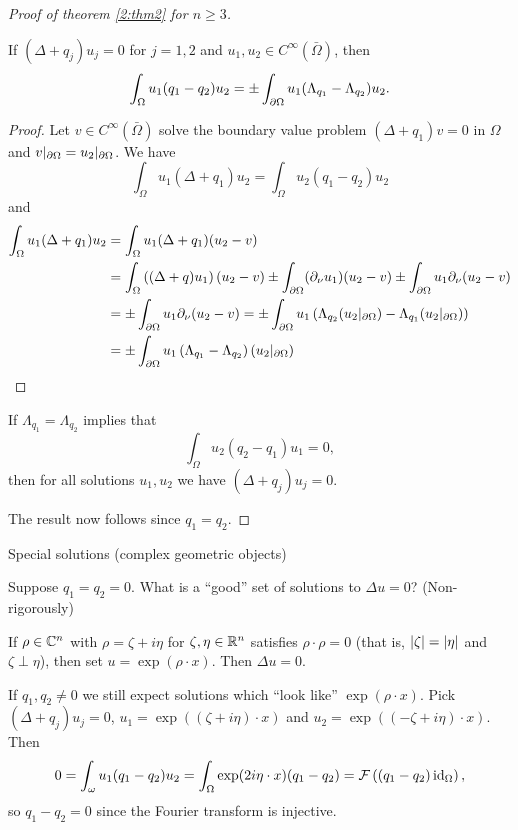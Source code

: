 \begin{proof}[Proof of theorem \ref{2:thm2} for $n \geq 3$]
  \begin{prop}
    If $(\Delta+q_j)u_j=0$ for $j=1,2$ and $u_1,u_2 \in C^\infty(\bar\Omega)$, then
    \[ \int_\Omega u_1(q_1-q_2)u_2 = \pm \int_{\partial\Omega} u_1(\Lambda_{q_1}-\Lambda_{q_2})u_2. \]
  \end{prop}

  \begin{proof}
    Let $v \in C^\infty(\bar\Omega)$ solve the boundary value problem $(\Delta+q_1)v=0$ in $\Omega$ and $v|_{\partial\Omega}=u_2|_{\partial\Omega}$.
    We have
    \[ \int_\Omega u_1(\Delta+q_1)u_2 = \int_\Omega u_2(q_1-q_2)u_2 \]
    and
    \begin{align*}
      \int_\Omega u_1(\Delta+q_1)u_2 &= \int_\Omega u_1(\Delta+q_1)(u_2-v) \\
      &= \int_\Omega \left( (\Delta+q)u_1 \right)(u_2-v) \pm \int_{\partial\Omega} (\partial_\nu u_1)(u_2-v) \pm \int_{\partial\Omega} u_1 \partial_\nu(u_2-v) \\
      &= \pm \int_{\partial\Omega} u_1 \partial_\nu (u_2-v) = \pm \int_{\partial\Omega} u_1\left( \Lambda_{q_2}(u_2|_{\partial\Omega}) - \Lambda_{q_1}(u_2|_{\partial\Omega}) \right) \\
      &= \pm \int_{\partial\Omega} u_1 \left( \Lambda_{q_1}-\Lambda_{q_2} \right)(u_2|_{\partial\Omega}) \qedhere
    \end{align*}
  \end{proof}

  \begin{cor}
    If $\Lambda_{q_1}=\Lambda_{q_2}$ implies that
    \[ \int_\Omega u_2(q_2-q_1)u_1=0, \]
    then for all solutions $u_1,u_2$ we have $(\Delta+q_j)u_j=0$.
  \end{cor}

  The result now follows since $q_1=q_2$.
\end{proof}

Special solutions (complex geometric objects)

Suppose $q_1=q_2=0$.
What is a ``good'' set of solutions to $\Delta u=0$?
(Non-rigorously)

If $\rho \in \mathbb{C}^n$ with $\rho=\zeta+i\eta$ for $\zeta,\eta \in \mathbb{R}^n$ satisfies $\rho \cdot \rho = 0$ (that is, $\left\lvert \zeta \right\rvert=\left\lvert \eta \right\rvert$ and $\zeta \perp \eta$), then set $u=\exp(\rho \cdot x)$.
Then $\Delta u=0$.

If $q_1,q_2 \neq 0$ we still expect solutions which ``look like'' $\exp(\rho \cdot x)$.
Pick $(\Delta+q_j)u_j=0$, $u_1=\exp\left( (\zeta+i\eta) \cdot x \right)$ and $u_2=\exp\left( (-\zeta+i\eta) \cdot x \right)$.
Then
\[ 0 = \int_\omega u_1(q_1-q_2)u_2 = \int_\Omega \exp(2i\eta \cdot x) (q_1-q_2) = \mathcal{F} \left( (q_1-q_2)\operatorname{id}_\Omega \right), \]
so $q_1-q_2=0$ since the Fourier transform is injective.
